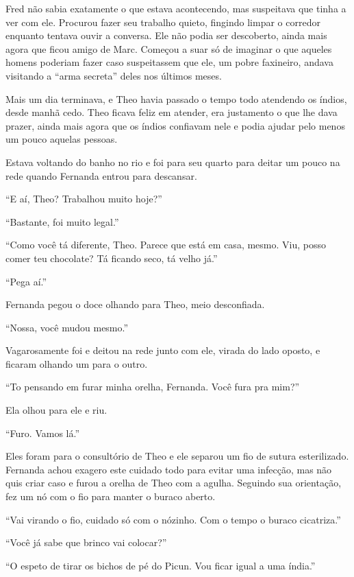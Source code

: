 Fred não sabia exatamente o que estava acontecendo, mas suspeitava que
tinha a ver com ele. Procurou fazer seu trabalho quieto, fingindo limpar
o corredor enquanto tentava ouvir a conversa. Ele não podia ser
descoberto, ainda mais agora que ficou amigo de Marc. Começou a suar só
de imaginar o que aqueles homens poderiam fazer caso suspeitassem que
ele, um pobre faxineiro, andava visitando a ``arma secreta'' deles nos
últimos meses.

\asterisc


Mais um dia terminava, e Theo havia passado o tempo todo atendendo os
índios, desde manhã cedo. Theo ficava feliz em atender, era
justamento o que lhe dava prazer, ainda mais agora que os índios
confiavam nele e podia ajudar pelo menos um pouco aquelas pessoas.

Estava voltando do banho no rio e foi para seu quarto para deitar um
pouco na rede quando Fernanda entrou para descansar.

``E aí, Theo? Trabalhou muito hoje?''

``Bastante, foi muito legal.''

``Como você tá diferente, Theo. Parece que está em casa, mesmo. Viu,
posso comer teu chocolate? Tá ficando seco, tá velho já.''

``Pega aí.''

Fernanda pegou o doce olhando para Theo, meio desconfiada.

``Nossa, você mudou mesmo.''

Vagarosamente foi e deitou na rede junto com ele, virada do lado oposto,
e ficaram olhando um para o outro.

``To pensando em furar minha orelha, Fernanda. Você fura pra mim?''

Ela olhou para ele e riu.

``Furo. Vamos lá.''

Eles foram para o consultório de Theo e ele separou um fio de sutura
esterilizado. Fernanda achou exagero este cuidado todo para evitar uma
infecção, mas não quis criar caso e furou a orelha de Theo com a agulha.
Seguindo sua orientação, fez um nó com o fio para manter o buraco
aberto.

``Vai virando o fio, cuidado só com o nózinho. Com o tempo o buraco
cicatriza.''

``Você já sabe que brinco vai colocar?''

``O espeto de tirar os bichos de pé do Picun. Vou ficar igual a uma
índia.''

